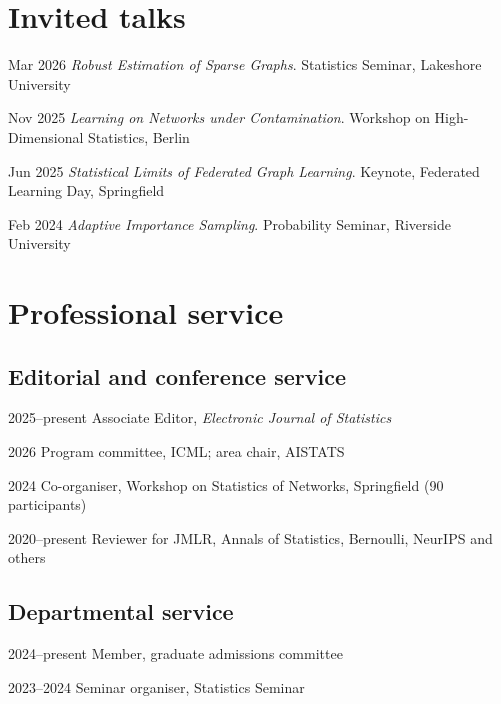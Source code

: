 \documentclass[11pt,a4paper]{article}
\begin{document}
\section{Invited talks}
\begin{cvlist}
  \item[Mar 2026] \emph{Robust Estimation of Sparse Graphs}. Statistics Seminar, Lakeshore University
  \item[Nov 2025] \emph{Learning on Networks under Contamination}. Workshop on High-Dimensional Statistics, Berlin
  \item[Jun 2025] \emph{Statistical Limits of Federated Graph Learning}. Keynote, Federated Learning Day, Springfield
  \item[Feb 2024] \emph{Adaptive Importance Sampling}. Probability Seminar, Riverside University
\end{cvlist}

\section{Professional service}
\subsection{Editorial and conference service}
\begin{cvlist}
  \item[2025--present] Associate Editor, \emph{Electronic Journal of Statistics}
  \item[2026] Program committee, ICML; area chair, AISTATS
  \item[2024] Co-organiser, Workshop on Statistics of Networks, Springfield (90 participants)
  \item[2020--present] Reviewer for JMLR, Annals of Statistics, Bernoulli, NeurIPS and others
\end{cvlist}
\subsection{Departmental service}
\begin{cvlist}
  \item[2024--present] Member, graduate admissions committee
  \item[2023--2024] Seminar organiser, Statistics Seminar
\end{cvlist}

\newcommand{\publist}[3]{%
  \begin{refcontext}[labelprefix=#1]
  \printbibliography[heading=pubs,title={#2},type=#3,resetnumbers=true]
  \end{refcontext}}
\end{document}
